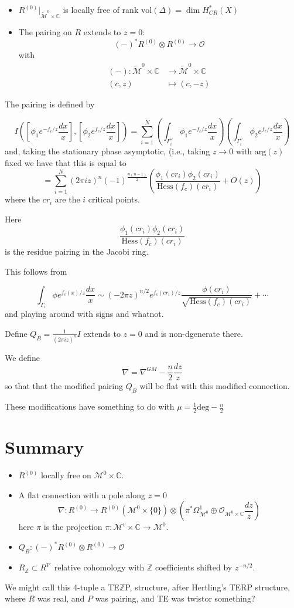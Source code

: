 \documentclass{amsart}
\theoremstyle{definition}
\newcommand{\Z}{\mathbb{Z}}
\newcommand{\OO}{\mathcal{O}}
\newcommand{\M}{\mathcal{M}}
\newcommand{\C}{\mathbb{C}}
\begin{document}
\begin{itemize}
\item $R^{(0)}\Big|_{\tilde{\M}^0\times\C}$ is locally free of rank $\text{vol}(\Delta)=\dim H_{CR}^*(X)$
\item The pairing on $R$ extends to $z=0$:
$$( - )^* R^{(0)}\otimes R^{(0)}\to\OO$$
with
\begin{align*}
(-):\tilde{\M}^0\times\C &\to \tilde{\M}^0\times\C \\
(c,z)&\mapsto (c,-z)
\end{align*}
\end{itemize}

The pairing is defined by

$$I\left(\left[\phi_1e^{-f_c/z}\frac{dx}{x}\right], \left[\phi_2e^{f_c/z}\frac{dx}{x}\right]\right)
=\sum_{i=1}^N\left(\int_{\Gamma_i^\vee} \phi_1e^{-f_c/z}\frac{dx}{x}\right)\left(\int_{\Gamma_i^\vee} \phi_2e^{f_c/z}\frac{dx}{x}\right)$$
and, taking the stationary phase asymptotic, (i.e., taking $z\to 0$ with $\text{arg}(z)$ fixed we have that this is equal to
$$
=\sum_{i=1}^N (2\pi i z)^n (-1)^{\frac{n(n-1)}{2}}\left(\frac{\phi_1(cr_i)\phi_2(cr_i)}{\text{Hess}(f_c)(cr_i)}+O(z)\right)$$
where the $cr_i$ are the $i$ critical points.

Here $$\frac{\phi_1(cr_i)\phi_2(cr_i)}{\text{Hess}(f_c)(cr_i)}$$ is the residue pairing in the Jacobi ring.

This follows from

$$\int_{\Gamma_i} \phi e^{f_c(x)/z}\frac{dx}{x}\sim (-2\pi z)^{n/2} e^{f_c(cr_i)/z} \frac{\phi(cr_i)}{\sqrt{\text{Hess}(f_c)(cr_i)}}+\cdots$$
and playing around with signs and whatnot.  

Define $Q_B=\frac{1}{(2\pi i z)^n} I$ extends to $z=0$ and is non-dgenerate there.

We define
$$\nabla=\nabla^{GM}-\frac{n}{2}\frac{dz}{z}$$ 
so that that the modified pairing $Q_B$ will be flat with this modified connection.

These modifications have something to do with $\mu=\frac{1}{2}\text{deg}-\frac{n}{2}$


\section{Summary}
\begin{itemize}
\item $R^{(0)}$ locally free on $\M^0\times\C$.
\item A flat connection with a pole along $z=0$
$$\nabla:R^{(0)}\to R^{(0)}(\M^0\times\{0\}) \otimes \left(\pi^*\Omega^1_{\M^0}\oplus\OO_{\M^0\times\C}\frac{dz}{z}\right)$$
here $\pi$ is the projection $\pi:\M^v\times\C\to\M^0$.
\item $Q_B:(-)^*R^{(0)}\otimes R^{(0)}\to\OO$
\item $R_\Z\subset R^{\nabla}$ relative cohomology with $\Z$ coefficients shifted by $z^{-n/2}$.
\end{itemize}
We might call this 4-tuple a TE$\Z$P, structure, after Hertling's TERP structure, where $R$ was real, and $P$ was pairing, and TE was twistor something?
\end{document}
